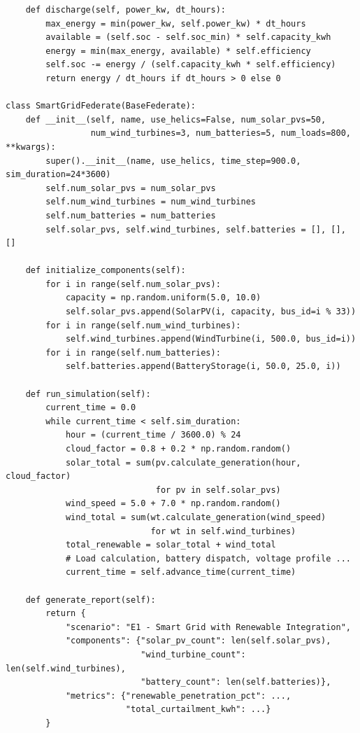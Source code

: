 \begin{listing}[H]
\begin{verbatim}
    def discharge(self, power_kw, dt_hours):
        max_energy = min(power_kw, self.power_kw) * dt_hours
        available = (self.soc - self.soc_min) * self.capacity_kwh
        energy = min(max_energy, available) * self.efficiency
        self.soc -= energy / (self.capacity_kwh * self.efficiency)
        return energy / dt_hours if dt_hours > 0 else 0

class SmartGridFederate(BaseFederate):
    def __init__(self, name, use_helics=False, num_solar_pvs=50,
                 num_wind_turbines=3, num_batteries=5, num_loads=800, **kwargs):
        super().__init__(name, use_helics, time_step=900.0, sim_duration=24*3600)
        self.num_solar_pvs = num_solar_pvs
        self.num_wind_turbines = num_wind_turbines
        self.num_batteries = num_batteries
        self.solar_pvs, self.wind_turbines, self.batteries = [], [], []

    def initialize_components(self):
        for i in range(self.num_solar_pvs):
            capacity = np.random.uniform(5.0, 10.0)
            self.solar_pvs.append(SolarPV(i, capacity, bus_id=i % 33))
        for i in range(self.num_wind_turbines):
            self.wind_turbines.append(WindTurbine(i, 500.0, bus_id=i))
        for i in range(self.num_batteries):
            self.batteries.append(BatteryStorage(i, 50.0, 25.0, i))

    def run_simulation(self):
        current_time = 0.0
        while current_time < self.sim_duration:
            hour = (current_time / 3600.0) % 24
            cloud_factor = 0.8 + 0.2 * np.random.random()
            solar_total = sum(pv.calculate_generation(hour, cloud_factor)
                              for pv in self.solar_pvs)
            wind_speed = 5.0 + 7.0 * np.random.random()
            wind_total = sum(wt.calculate_generation(wind_speed)
                             for wt in self.wind_turbines)
            total_renewable = solar_total + wind_total
            # Load calculation, battery dispatch, voltage profile ...
            current_time = self.advance_time(current_time)

    def generate_report(self):
        return {
            "scenario": "E1 - Smart Grid with Renewable Integration",
            "components": {"solar_pv_count": len(self.solar_pvs),
                           "wind_turbine_count": len(self.wind_turbines),
                           "battery_count": len(self.batteries)},
            "metrics": {"renewable_penetration_pct": ...,
                        "total_curtailment_kwh": ...}
        }
\end{verbatim}
\caption{\texttt{scenarios/scenario\_e1.py} --- Smart grid federate (condensed)}
\label{lst:app-e1-federate}
\end{listing}

